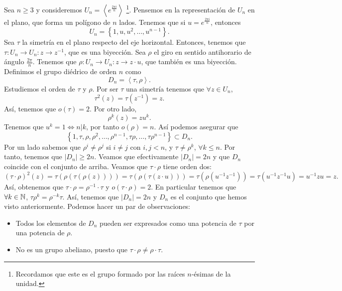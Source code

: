 \begin{eg}
Sea $\displaystyle n \geq 3 $ y consideremos $\displaystyle U_{n} = \left\langle e^{\frac{2\pi i }{n}} \right\rangle $ \footnote{Recordamos que este es el grupo formado por las raíces $\displaystyle n $-ésimas de la unidad.}. Pensemos en la representación de $\displaystyle U_{n} $ en el plano, que forma un polígono de $\displaystyle n $ lados. Tenemos que si $\displaystyle u = e^{\frac{2\pi i }{n}} $, entonces
\[U_{n} = \left\{ 1, u, u^{2}, \ldots, u^{n-1}\right\}  .\]
Sea $\displaystyle \tau $ la simetría en el plano respecto del eje horizontal. Entonces, tenemos que $\displaystyle \tau : U_{n} \to U_{n} : z \to z^{-1} $, que es una biyección. Sea $\displaystyle \rho $ el giro en sentido antihorario de ángulo $\displaystyle \frac{2\pi }{n} $. Tenemos que $\displaystyle \rho : U_{n} \to U_{n} : z \to z \cdot u $, que también es una biyección. Definimos el grupo diédrico de orden $\displaystyle n $ como 
\[D_{n} = \left\langle \tau , \rho \right\rangle  .\]
Estudiemos el orden de $\displaystyle \tau  $ y $\displaystyle \rho $. Por ser $\displaystyle \tau $ una simetría tenemos que $\displaystyle \forall z \in U_{n} $,
\[\tau ^{2}\left(z\right) = \tau\left(z^{-1}\right) = z .\]
Así, tenemos que $\displaystyle o\left(\tau \right) = 2 $. Por otro lado, 
\[\rho ^{k}\left(z\right) = z u^{k} .\]
Tenemos que $\displaystyle u^{k} = 1 \iff n|k$, por tanto $\displaystyle o\left(\rho \right) = n $. Así podemos asegurar que  
\[ \left\{ 1, \tau, \rho, \rho^{2}, \ldots, \rho ^{n -1}, \tau \rho, \ldots, \tau \rho^{n-1}\right\} \subset D_{n}.\]
Por un lado sabemos que $\displaystyle \rho^{i} \neq \rho^{j} $ si $\displaystyle i \neq j $ con $\displaystyle i,j < n $, y $\displaystyle \tau \neq \rho^{k} $, $\displaystyle \forall k \leq n $. Por tanto, tenemos que $\displaystyle \left|D_{n}\right| \geq 2n $. Veamos que efectivamente $\displaystyle \left|D_{n}\right| = 2n $ y que $\displaystyle D_{n} $ coincide con el conjunto de arriba. Veamos que $\displaystyle \tau \cdot \rho $ tiene orden dos:
\[\left(\tau \cdot \rho\right)^{2} \left(z\right) = \tau\left(\rho\left(\tau\left(\rho\left(z\right)\right)\right)\right) = \tau\left(\rho\left(\tau\left(z \cdot u\right)\right)\right) = \tau\left(\rho\left(u^{-1}z^{-1}\right)\right) = \tau\left(u^{-1}z^{-1}u\right) = u^{-1}zu = z .\]
Así, obtenemos que $\displaystyle \tau \cdot \rho = \rho^{-1} \cdot \tau $ y $\displaystyle o\left(\tau \cdot \rho\right) = 2 $. En particular tenemos que $\displaystyle \forall k \in \mathbb{N} $, $\displaystyle \tau\rho^{k} = \rho^{-k}\tau $. Así, tenemos que $\displaystyle \left|D_{n}\right| = 2n $ y $\displaystyle D_{n} $ es el conjunto que hemos visto anteriormente. Podemos hacer un par de observaciones:
\begin{itemize}
\item Todos los elementos de $\displaystyle D_{n} $ pueden ser expresados como una potencia de $\displaystyle \tau $ por una potencia de $\displaystyle \rho $.
\item No es un grupo abeliano, puesto que $\displaystyle \tau \cdot \rho \neq \rho \cdot \tau $. 
\end{itemize}
\end{eg}
